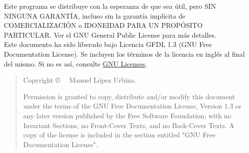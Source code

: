 Este programa se distribuye con la esperanza de que sea útil, pero SIN NINGUNA GARANTÍA, incluso sin la garantía implícita de COMERCIALIZACIÓN o IDONEIDAD PARA UN PROPÓSITO PARTICULAR. Ver el GNU
General Public License para más detalles.\\

Este documento ha sido liberado bajo Licencia GFDL 1.3 (GNU Free Documentation License). Se incluyen los términos de la licencia en inglés al final del mismo. Si no es así, 
consulte \href{http://www.gnu.org/licenses/}{GNU Licenses}.\\\bigskip

\begin{quote}
Copyright \copyright~\the\year~ Manuel López Urbina.\bigskip

Permission is granted to copy, distribute and/or modify this document under the terms of the GNU Free Documentation License, Version 1.3 or  any later version published by the Free Software Foundation; with no Invariant Sections, no Front-Cover Texts, and no Back-Cover Texts. A copy of the license is included
in the section entitled "GNU Free Documentation License".
\end{quote}


\cleardoublepage

